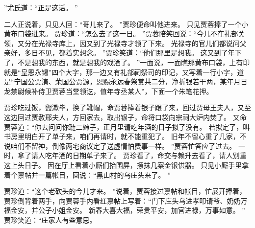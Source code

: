 ”尤氏道：“正是这话。
”\par
二人正说着，只见人回：“哥儿来了。
”贾珍便命叫他进来。
只见贾蓉捧了一个小黄布口袋进来。
贾珍道：“怎么去了这一日。
”贾蓉陪笑回说：“今儿不在礼部关领，又分在光禄寺库上，因又到了光禄寺才领了下来。
光禄寺的官儿们都说问父亲好，多日不见，都着实想念。
”贾珍笑道：“他们那里是想我。
这又到了年下了，不是想我的东西，就是想我的戏酒了。
”一面说，一面瞧那黄布口袋，上有印就是“皇恩永锡”四个大字，那一边又有礼部祠祭司的印记，又写着一行小字，道是“宁国公贾演、荣国公贾源，恩赐永远春祭赏共二分，净折银若干两，某年月日龙禁尉候补侍卫贾蓉当堂领讫，值年寺丞某人”，下面一个朱笔花押。
\par
贾珍吃过饭，盥漱毕，换了靴帽，命贾蓉捧着银子跟了来，回过贾母王夫人，又至这边回过贾赦邢夫人，方回家去，取出银子，命将口袋向宗祠大炉内焚了。
又命贾蓉道：“你去问问你琏二婶子，正月里请吃年酒的日子拟了没有。
若拟定了，叫书房里明白开了单子来，咱们再请时，就不能重犯了。
旧年不留心重了几家，不说咱们不留神，倒像两宅商议定了送虚情怕费事一样。
”贾蓉忙答应了过去。
一时，拿了请人吃年酒的日期单子来了。
贾珍看了，命交与赖升去看了，请人别重这上头日子。
因在厅上看着小厮们抬围屏，擦抹几案金银供器。
只见小厮手里拿着个禀帖并一篇帐目，回说：“黑山村的乌庄头来了。
”\par
贾珍道：“这个老砍头的今儿才来。
”说着，贾蓉接过禀帖和帐目，忙展开捧着，贾珍倒背着两手，向贾蓉手内看红禀帖上写着：“门下庄头乌进孝叩请爷、奶奶万福金安，并公子小姐金安。
新春大喜大福，荣贵平安，加官进禄，万事如意。
”
贾珍笑道：“庄家人有些意思。
